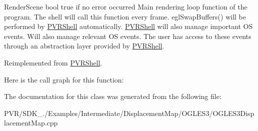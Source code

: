   Render\+Scene  bool true if no error occurred  Main rendering loop function of the program. The shell will call this function every frame. egl\+Swap\+Buffers() will be performed by \hyperlink{class_p_v_r_shell}{P\+V\+R\+Shell} automatically. \hyperlink{class_p_v_r_shell}{P\+V\+R\+Shell} will also manage important O\+S events. Will also manage relevant O\+S events. The user has access to these events through an abstraction layer provided by \hyperlink{class_p_v_r_shell}{P\+V\+R\+Shell}. 

Reimplemented from \hyperlink{class_p_v_r_shell_ae0eb5f797cbe993a22b8659f9c332578}{P\+V\+R\+Shell}.



Here is the call graph for this function\+:




The documentation for this class was generated from the following file\+:\begin{DoxyCompactItemize}
\item 
P\+V\+R/\+S\+D\+K\+\_./\+Examples/\+Intermediate/\+Displacement\+Map/\+O\+G\+L\+E\+S3/O\+G\+L\+E\+S3\+Displacement\+Map.\+cpp\end{DoxyCompactItemize}
